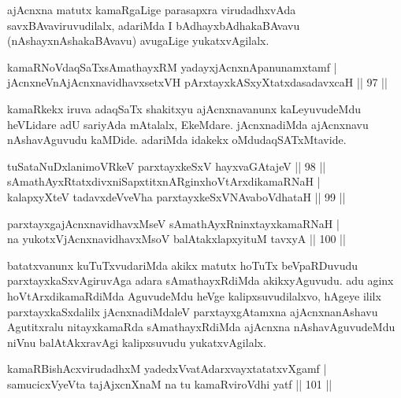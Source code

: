 \begin{artha}
ajAcnxna matutx kamaRgaLige parasapxra virudadhxvAda savxBAvaviruvudilalx, adariMda I bAdhayxbAdhakaBAvavu (nAshayxnAshakaBAvavu) avugaLige yukatxvAgilalx.
\end{artha}

\begin{shl}
kamaRNoV\s daqSaTxsAmathayxRM yadayxjAcnxnApanunamxtamf |\\
jAcnxneVnAjAcnxnavidhavxsetxVH pArxtayxkASxyXtatxdasadavxcaH \hfill || 97 ||
\end{shl}

\begin{artha}
kamaRkekx iruva adaqSaTx shakitxyu ajAcnxnavanunx kaLeyuvudeMdu heVLidare adU sariyAda mAtalalx, EkeMdare. jAcnxnadiMda ajAcnxnavu nAshavAguvudu kaMDide. adariMda idakekx oMdudaqSATxMtavide.
\end{artha}

\begin{shl}
tuSataNuDxlanimoVRkeV parxtayxkeSxV hayxvaGAtajeV \hfill || 98 ||	\\
sAmathAyxRtatxdivxniSapxtitxnARginxhoVtArxdikamaRNaH |\\
kalapxyXteV tadavxdeVveVha parxtayxkeSxVNAvaboVdhataH \hfill || 99 ||
\end{shl}

\begin{shl}
parxtayxgajAcnxnavidhavxMseV sAmathAyxRninxtayxkamaRNaH |\\
na yukotxV\s jAcnxnavidhavxMsoV balAtakxlapxyituM tavxyA \hfill || 100 ||
\end{shl}

\begin{artha}
batatxvanunx kuTuTxvudariMda akikx matutx hoTuTx beVpaRDuvudu parxtayxkaSxvAgiruvAga adara sAmathayxRdiMda akikxyAguvudu. adu aginx hoVtArxdikamaRdiMda AguvudeMdu heVge kalipxsuvudilalxvo, hAgeye ililx parxtayxkaSxdalilx jAcnxnadiMdaleV parxtayxgAtamxna ajAcnxnanAshavu Agutitxralu nitayxkamaRda sAmathayxRdiMda ajAcnxna nAshavAguvudeMdu niVnu balAtAkxravAgi kalipxsuvudu yukatxvAgilalx.
\end{artha}


\begin{shl}
kamaRBishAcxvirudadhxM yadedxVvatAdarxvayxtatatxvXgamf |\\
samucicxVyeVta tajAjxcnXnaM na tu kamaRviroVdhi yatf \hfill || 101 ||
\end{shl}

